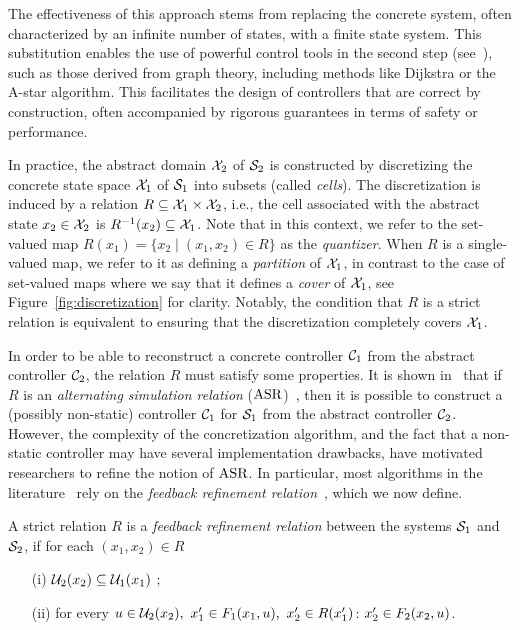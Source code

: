 \documentclass{juliacon}
\begin{document}
\vskip 6pt
The effectiveness of this approach stems from replacing the concrete system, often characterized by an infinite number of states, with a finite state system. This substitution enables the use of powerful control tools in the second step (see~\cite{belta2017formal,kupferman2001model}), such as those derived from graph theory, including methods like Dijkstra or the A-star algorithm. This facilitates the design of controllers that are correct by construction, often accompanied by rigorous guarantees in terms of safety or performance.

\vskip 6pt
In practice, the abstract domain $\mathcal{X}_2$ of $\mathcal{S}_2$ is constructed by discretizing the concrete state space $\mathcal{X}_1$ of $\mathcal{S}_1$ into subsets (called \emph{cells}). The discretization is induced by a relation $R\subseteq \mathcal{X}_1\times \mathcal{X}_2$, i.e., the cell associated with the abstract state $x_2\in\mathcal{X}_2$ is $R^{-1}(x_2)\subseteq \mathcal{X}_1$.
Note that in this context, we refer to the set-valued map $R(x_1) = \{x_2 \mid (x_1, x_2)\in R\}$ as the \emph{quantizer}.
When $R$ is a single-valued map, we refer to it as defining a \emph{partition} of $\mathcal{X}_1$, in contrast to the case of set-valued maps where we say that it defines a \emph{cover} of $\mathcal{X}_1$, see Figure~\ref{fig:discretization} for clarity.
Notably, the condition that $R$ is a strict relation is equivalent to ensuring that the discretization completely covers $\mathcal{X}_1$.

\vskip 6pt

In order to be able to reconstruct a concrete controller $\mathcal{C}_1$ from the abstract controller $\mathcal{C}_2$, the relation $R$ must satisfy some properties. It is shown in~\cite[Theorem 1]{Calbert2024a} that if $R$ is an \emph{alternating simulation relation} ($\operatorname{ASR}$)~\cite[Definition 4.19]{tabuada2009verification}, then it is possible to construct a (possibly non-static) controller $\mathcal{C}_1$ for $\mathcal{S}_1$ from the abstract controller $\mathcal{C}_2$.
%
However, the complexity of the concretization algorithm, and the fact that a non-static controller may have several implementation drawbacks, have motivated researchers to refine the notion of $\operatorname{ASR}$. In particular, most algorithms in the literature~\cite{rungger2016scots,borri2018design,calbert2021alternating} rely on the \emph{feedback refinement relation}~\cite[Def. V.2]{reissig2016feedback}, which we now define.
\begin{defi}\label{def:FRR}
A strict relation $R$ is a \emph{feedback refinement relation} between the systems $\mathcal{S}_1$ and $\mathcal{S}_2$, if for each $(x_1,x_2)\in R$
\begin{enumerate}
    \item[(i)] $\mathcal{U}_2(x_2)\subseteq \mathcal{U}_1(x_1)$ \label{cond:i:FRR};
    \item[(ii)] for every $u \in \mathcal{U}_2(x_2),\ x_1'\in F_1(x_1, u), \ x_2'\in R(x_1')$: $ x_2'\in F_2(x_2, u)$.
\end{enumerate}
\end{defi}
\end{document}
